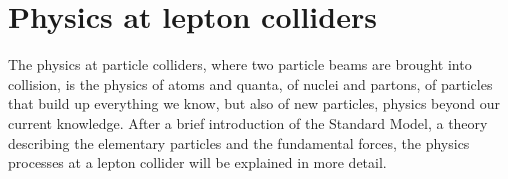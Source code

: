 \chapter{Physics at lepton colliders}
\label{Lepton_Physics}
\begin{chapterabstract}
The physics at particle colliders, where two particle beams are brought into collision, is the physics of atoms and quanta, of nuclei and partons, of particles that build up everything we know, but also of new particles, physics beyond our current knowledge.
After a brief introduction of the Standard Model, a theory describing the elementary particles and the fundamental forces, the physics processes at a lepton collider will be explained in more detail.
\end{chapterabstract}
\newline


